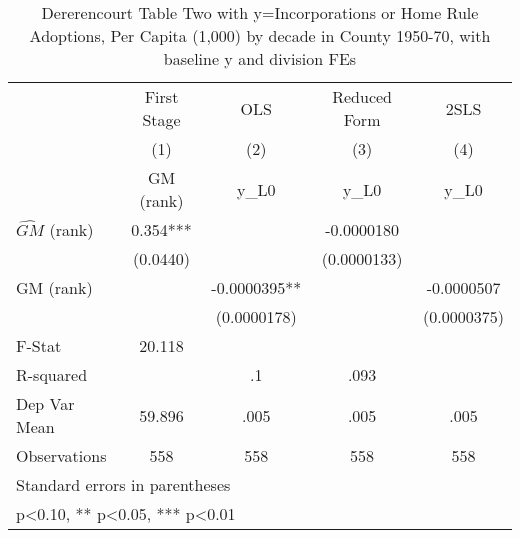 \begin{table}[htbp]\centering
\def\sym#1{\ifmmode^{#1}\else\(^{#1}\)\fi}
\caption{Dererencourt Table Two with y=Incorporations or Home Rule Adoptions, Per Capita (1,000) by decade in County 1950-70, with baseline y and division FEs}
\begin{tabular}{l*{4}{c}}
\toprule
                    & First Stage   &         OLS   &Reduced Form   &        2SLS   \\
                    &\multicolumn{1}{c}{(1)}&\multicolumn{1}{c}{(2)}&\multicolumn{1}{c}{(3)}&\multicolumn{1}{c}{(4)}\\
                    &\multicolumn{1}{c}{GM  (rank)}&\multicolumn{1}{c}{y\_L0}&\multicolumn{1}{c}{y\_L0}&\multicolumn{1}{c}{y\_L0}\\
\midrule
$\hat{GM}$ (rank)   &       0.354***&               &  -0.0000180   &               \\
                    &    (0.0440)   &               & (0.0000133)   &               \\
\addlinespace
GM  (rank)          &               &  -0.0000395** &               &  -0.0000507   \\
                    &               & (0.0000178)   &               & (0.0000375)   \\
\midrule
F-Stat              &      20.118   &               &               &               \\
R-squared           &               &          .1   &        .093   &               \\
Dep Var Mean        &      59.896   &        .005   &        .005   &        .005   \\
Observations        &         558   &         558   &         558   &         558   \\
\bottomrule
\multicolumn{5}{l}{\footnotesize Standard errors in parentheses}\\
\multicolumn{5}{l}{\footnotesize * p<0.10, ** p<0.05, *** p<0.01}\\
\end{tabular}
\end{table}
